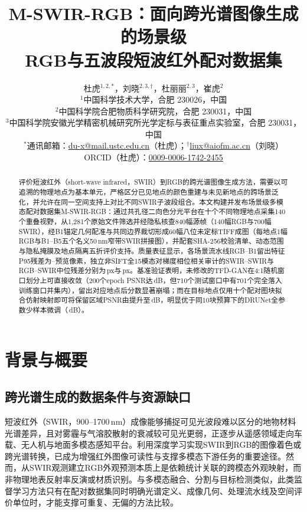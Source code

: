 \documentclass[UTF8,a4paper,10pt]{ctexart}
\title{\textbf{M-SWIR-RGB：面向跨光谱图像生成的场景级\\RGB与五波段短波红外配对数据集}}
\author{杜虎$^{1,2,*}$，刘晓$^{2,3,\dagger}$，杜丽丽$^{2,3}$，崔虎$^{2}$\\[0.35em]
\small $^{1}$中国科学技术大学，合肥 230026，中国\\
\small $^{2}$中国科学院合肥物质科学研究院，合肥 230031，中国\\
\small $^{3}$中国科学院安徽光学精密机械研究所光学定标与表征重点实验室，合肥 230031，中国\\[0.25em]
\small $^{*}$通讯邮箱：\href{mailto:du-x@mail.ustc.edu.cn}{du-x@mail.ustc.edu.cn}（杜虎）；$^{\dagger}$\href{mailto:liux@aiofm.ac.cn}{liux@aiofm.ac.cn}（刘晓）\\
\small ORCID（杜虎）：\href{https://orcid.org/0009-0006-1742-2455}{0009-0006-1742-2455}}
\date{}
\begin{document}
\maketitle
\begin{abstract}
评价短波红外（short-wave infrared，SWIR）到RGB的跨光谱图像生成方法，需要以可追溯的物理地点为基本单元，严格区分已见地点的颜色重建与未见新地点的跨场景泛化，并允许在同一空间支持上对比不同SWIR子波段组合。本文构建并发布场景级多模态配对数据集M-SWIR-RGB：通过共孔径二向色分光平台在十个不同物理地点采集140个重叠视野，从1{,}281个原始文件筛选并经隐私核查840幅源帧（140幅RGB与700幅SWIR），经B1锚定几何配准与共同边界裁切形成60幅八位未定标TIFF成图（每地点1幅RGB与B1--B5五个名义50\,nm窄带SWIR拼接图），并配套SHA-256校验清单、动态范围与隐私掩膜及地点隔离五折评价支持。质量表征显示，各场景流水线RGB--B1留出特征P95残差为\GeomRgbBOnePrevMin--\GeomRgbBOnePrevMax{}预览像素，独立非SIFT全15模态对梯度相位相关审计的SWIR--SWIR与RGB--SWIR中位残差分别为\AuditSwirSwirMed\,px与\AuditRgbSwirMed\,px。基准验证表明，未修改的TFD-GAN在4:1随机窗口划分上可直接收敛（200个epoch PSNR达\MsEpTwoHundredPsnrPm\,dB，但710个测试窗口中有701个完全落入训练窗口并集内），留出对应地点后分数显著崩塌；而在目标地点仅用十个配对图块拟合仿射映射即可将保留区域PSNR由\CalibrationCross{}提升至\CalibrationTarget\,dB，明显优于同10块预算下的DRUNet全参数少样本微调（\TrackCDrFtPsnr\,dB）。
\end{abstract}

\section{背景与概要}
\subsection{跨光谱生成的数据条件与资源缺口}
短波红外（SWIR，900--1700\,nm）成像能够捕捉可见光波段难以区分的地物材料光谱差异，且对雾霾与气溶胶散射的衰减较可见光更弱，正逐步从遥感领域走向车载、无人机与地面多模态感知平台\cite{narasimhan2002,rogalski2003,bijelic2020fog,song2024,sivaprakasam2023,bessonov2025,duan2025}。利用深度学习实现SWIR到RGB的图像着色或跨光谱转换，已成为增强红外图像可读性与支撑多模态下游任务的重要途径\cite{levin2004colorization,zhang2016colorful,borstelmann2024,chen2025,chen2026threeband}。然而，从SWIR观测建立RGB外观预测本质上是依赖统计关联的跨模态外观映射，而非物理地表反射率反演或材质识别。与多模态融合、分割与目标检测类似\cite{ha2017,hwang2015,jia2021,liu2023segmif}，此类监督学习方法只有在配对数据集同时明确光谱定义、成像几何、处理流水线及空间评价单位时，才能支撑可重复、无偏的方法比较\cite{gebru2021,wilkinson2016}。
\end{document}
